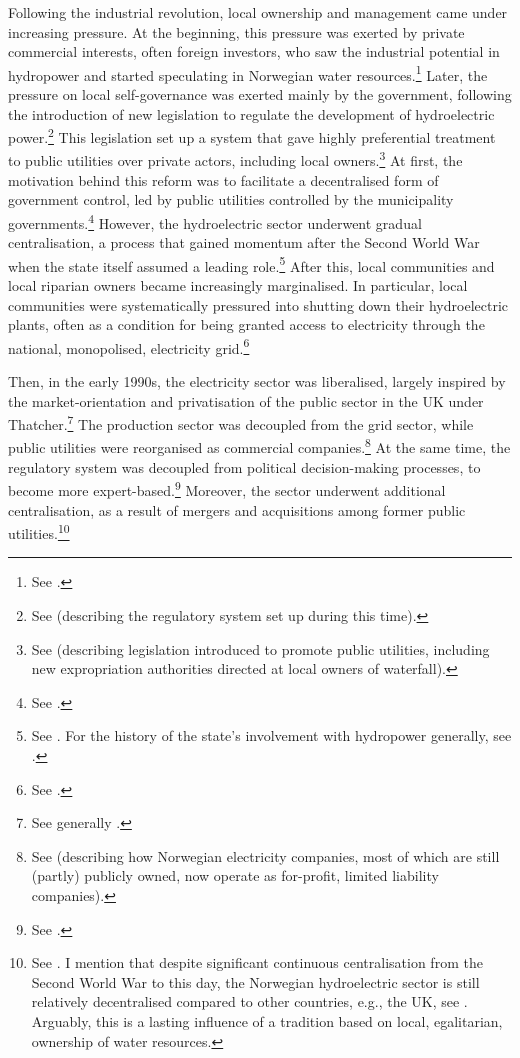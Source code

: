 Following the industrial revolution, local ownership and management came under increasing pressure. At the beginning, this pressure was exerted by private commercial interests, often foreign investors, who saw the industrial potential in hydropower and started speculating in Norwegian water resources.\footnote{See \cite[30-31]{nou04}.} Later, the pressure on local self-governance was exerted mainly by the government, following the introduction of new legislation to regulate the development of hydroelectric power.\footnote{See \cite[41-57]{thue96} (describing the  regulatory system set up during this time).} This legislation set up a system that gave highly preferential treatment to public utilities over private actors, including local owners.\footnote{See \cite[46]{thue96} (describing legislation introduced to promote public utilities, including new expropriation authorities directed at local owners of waterfall).} At first, the motivation behind this reform was to facilitate a decentralised form of government control, led by public utilities controlled by the municipality governments.\footnote{See \cite[44-47]{thue96}.} However, the hydroelectric sector underwent gradual centralisation, a process that gained momentum after the Second World War when the state itself assumed a leading role.\footnote{See \cite[59-85]{thue96}. For the history of the state's involvement with hydropower generally, see \cite{thue06, skjold06,thue06b}.} After this, local communities and local riparian owners became increasingly marginalised. In particular, local communities were systematically pressured into shutting down their hydroelectric plants, often as a condition for being granted access to electricity through the national, monopolised, electricity grid.\footnote{See \cite[p.111]{hindrum94}.}

Then, in the early 1990s, the electricity sector was liberalised, largely inspired by the market-orientation and privatisation of the public sector in the UK under Thatcher.\footnote{See generally \cite{midttun98}.} The production sector was decoupled from the grid sector, while public utilities were reorganised as commercial companies.\footnote{See \cite[86]{efta07} (describing how Norwegian electricity companies, most of which are still (partly) publicly owned, now operate as for-profit, limited liability companies).} At the same time, the regulatory system was decoupled from political decision-making processes, to become more expert-based.\footnote{See \cite[26-27]{brekke12}.} Moreover, the sector underwent additional centralisation, as a result of mergers and acquisitions among former public utilities.\footnote{See \cite[583]{bibow03}. I mention that despite significant continuous centralisation from the Second World War to this day, the Norwegian hydroelectric sector is still relatively decentralised compared to other countries, e.g., the UK, see \cite[181]{midttun98}. Arguably, this is a lasting influence of a tradition based on local, egalitarian, ownership of water resources.}

